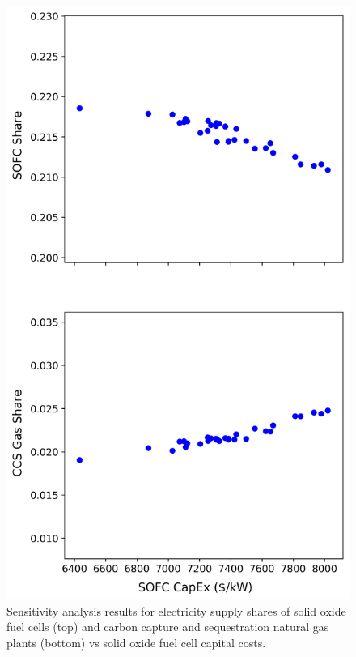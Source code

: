 \begin{figure}[H] 
\centering
\includegraphics[scale=0.7]{figures/satechselc_abbrv}
\caption{Sensitivity analysis results for electricity supply shares of solid oxide fuel cells (top) and carbon capture and sequestration natural gas plants (bottom) vs solid oxide fuel cell capital costs.}
\label{satechs-smol}
\end{figure}

